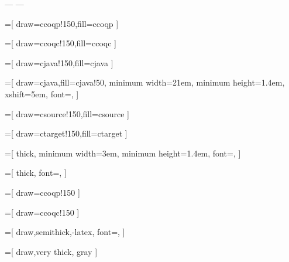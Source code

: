 ---
---


=[
 draw=ccoqp!150,fill=ccoqp
]

=[
 draw=ccoqc!150,fill=ccoqc
]

=[
 draw=cjava!150,fill=cjava
]

=[
 draw=cjava,fill=cjava!50,
 minimum width=21em,
 minimum height=1.4em,
 xshift=5em,
 font=\scriptsize\sffamily,
]

=[
 draw=csource!150,fill=csource
]

=[
 draw=ctarget!150,fill=ctarget
]

=[
 thick,
 minimum width=3em,
 minimum height=1.4em,
 font=\scriptsize\sffamily,
]

=[
 thick,
 font=\scriptsize\sffamily,
]

=[
 draw=ccoqp!150
]

=[
 draw=ccoqc!150
]

=[
 draw,semithick,-latex,
 font=\scriptsize\sffamily,
]

=[
 draw,very thick, gray
]

\newcommand{\tikzoptim}[3][]{
   \path[trans, draw=#1!150, fill=#1!150] (#2) edge [looseness=10, loop above, draw=#1!150]
       node [pos=0.5](#2-optim) {}
       node [yshift = 0.5em,below] {\href{#3}{\phantom{XXX}} \\ \href{#3}{\phantom{XXX}}} ();
}
\newcommand{\tikzloop}[4][]{
   \path[trans, draw=#1!150, fill=#1!150] (#2) edge [looseness=10, loop above, draw=#1!150]
       node [pos=0.5](#2-optim) {#4}
       node [yshift = 0.5em,below] {\href{#3}{\phantom{XXX}} \\ \href{#3}{\phantom{XXX}}} ();
}
\newcommand{\tikzoptimdashed}[3][]{
   \path[trans, draw=#1!150, fill=#1!150] (#2) edge [looseness=10, loop above, dashed, draw=#1!150]
       node [pos=0.5](#2-optim) {}
       node [yshift = 0.5em,below] {\href{#3}{\phantom{XXX}} \\ \href{#3}{\phantom{XXX}}} ();
}


